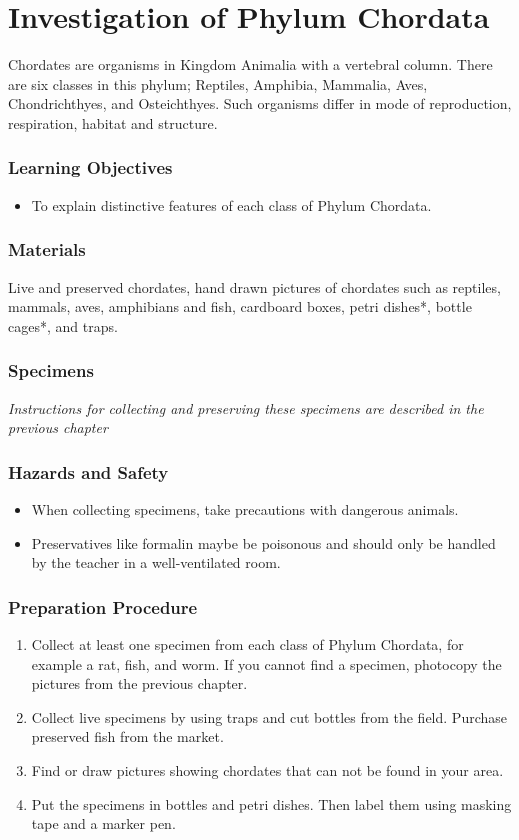 \section{Investigation of Phylum Chordata}
Chordates are organisms in Kingdom Animalia with a vertebral column. There are six classes in this phylum; Reptiles, Amphibia, Mammalia, Aves, Chondrichthyes, and Osteichthyes. Such organisms differ in mode of reproduction, respiration, habitat and structure.

\subsubsection*{Learning Objectives}
\begin{itemize}
\item{To explain distinctive features of each class of Phylum Chordata.}
\end{itemize}

\subsubsection*{Materials}
Live and preserved chordates, hand drawn pictures of chordates such as reptiles, mammals, aves, amphibians and fish, cardboard boxes, petri dishes*, bottle cages*, and traps.

\subsubsection*{Specimens}
\textit{Instructions for collecting and preserving these specimens are described in the previous chapter}

\subsubsection*{Hazards and Safety}
\begin{itemize}
\item{When collecting specimens, take precautions with dangerous animals.}
\item{Preservatives like formalin maybe be poisonous and should only be handled by the teacher in a well-ventilated room.}
\end{itemize}

\subsubsection*{Preparation Procedure}
\begin{enumerate}
\item{Collect at least one specimen from each class of Phylum Chordata, for example a rat, fish, and worm. If you cannot find a specimen, photocopy the pictures from the previous chapter.}
\item{Collect live specimens by using traps and cut bottles from the field. Purchase preserved fish from the market.}
\item{Find or draw pictures showing chordates that can not be found in your area.}
\item{Put the specimens in bottles and petri dishes. Then label them using masking tape and a marker pen.}
\end{enumerate}

